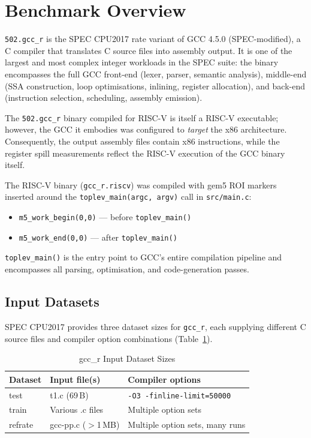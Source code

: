 \documentclass[conference]{IEEEtran}
\begin{document}
\section{Benchmark Overview}

\texttt{502.gcc\_r} is the SPEC CPU2017 rate variant of GCC 4.5.0
(SPEC-modified), a C compiler that translates C source files into
assembly output. It is one of the largest and most complex integer
workloads in the SPEC suite: the binary encompasses the full GCC
front-end (lexer, parser, semantic analysis), middle-end (SSA
construction, loop optimisations, inlining, register allocation),
and back-end (instruction selection, scheduling, assembly emission).

The \texttt{502.gcc\_r} binary compiled for RISC-V is itself a
RISC-V executable; however, the GCC it embodies was configured to
\emph{target} the x86 architecture. Consequently, the output assembly
files contain x86 instructions, while the register spill measurements
reflect the RISC-V execution of the GCC binary itself.

The RISC-V binary (\texttt{gcc\_r.riscv}) was compiled with gem5
ROI markers inserted around the \texttt{toplev\_main(argc, argv)}
call in \texttt{src/main.c}:

\begin{itemize}
    \item \texttt{m5\_work\_begin(0,0)} --- before \texttt{toplev\_main()}
    \item \texttt{m5\_work\_end(0,0)}   --- after  \texttt{toplev\_main()}
\end{itemize}

\texttt{toplev\_main()} is the entry point to GCC's entire compilation
pipeline and encompasses all parsing, optimisation, and code-generation
passes.

\subsection{Input Datasets}

SPEC CPU2017 provides three dataset sizes for \texttt{gcc\_r}, each
supplying different C source files and compiler option combinations
(Table~\ref{tab:inputs}).

\begin{table}[H]
\centering
\caption{gcc\_r Input Dataset Sizes}
\label{tab:inputs}
\begin{tabular}{lll}
\toprule
\textbf{Dataset} & \textbf{Input file(s)} & \textbf{Compiler options} \\
\midrule
test    & t1.c (69\,B)      & \texttt{-O3 -finline-limit=50000} \\
train   & Various .c files  & Multiple option sets \\
refrate & gcc-pp.c ($>$1\,MB) & Multiple option sets, many runs \\
\bottomrule
\end{tabular}
\end{table}
\end{document}
